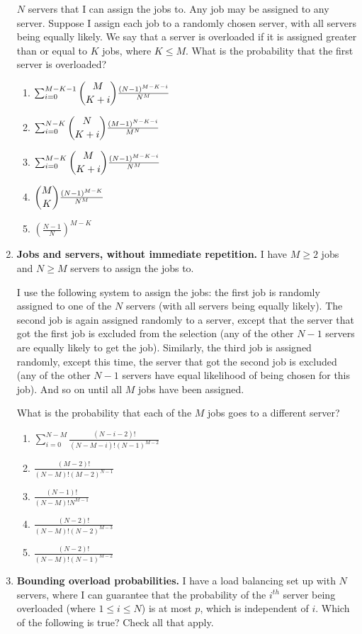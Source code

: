 \documentclass[11pt, preview]{standalone} %
\begin{document}
\begin{enumerate}
    $N$ servers that I can assign the jobs to. Any job may be assigned to any 
    server. Suppose I assign each job to a randomly chosen server, with all 
    servers being equally likely. We say that a server is overloaded if it is 
    assigned greater than or equal to $K$ jobs, where $K \leq M$. What is the 
    probability that the first server is overloaded?
\begin{Multi}
\begin{enumerate}
    \FalseChoice\item $\sum_{i=0}^{M-K-1} \dbinom{M}{K+i} \frac{(N-1)^{M-K-i}}{N^{M}}$
    \FalseChoice\item $\sum_{i=0}^{N-K} \dbinom{N}{K+i} \frac{(M-1)^{N-K-i}}{M^{N}}$
    \TrueChoice\item $\sum_{i=0}^{M-K} \dbinom{M}{K+i} \frac{(N-1)^{M-K-i}}{N^{M}}$
    \FalseChoice\item $\dbinom{M}{K} \frac{(N-1)^{M-K}}{N^{M}}$
    \FalseChoice\item $\left(\frac{N-1}{N}\right)^{M-K}$
\end{enumerate}
\end{Multi}
\item {\bf Jobs and servers, without immediate repetition.} I have $M\geq 2$ 
    jobs and $N \geq M$ servers to assign the jobs to.
    
    I use the following system to assign the jobs: the 
    first job is randomly assigned to one of the $N$ servers (with all servers 
    being equally likely). The second job is again assigned randomly to a 
    server, except that the server that got the first job is excluded from the 
    selection (any of the other $N-1$ servers are equally likely to get the job). 
    Similarly, the third job is assigned randomly, except this time, the 
    server that got the second job is excluded (any of the other $N-1$ servers 
    have equal likelihood of being chosen for this job). And so on until all 
    $M$ jobs have been assigned.

    What is the probability that each of the $M$ jobs goes to a different 
    server?
\begin{Multi}
\begin{enumerate}
    \FalseChoice\item $\sum_{i=0}^{N-M}\frac{(N-i-2)!}{(N-M-i)! (N-1)^{M-2}}$
    \FalseChoice\item $\frac{(M-2)!}{(N-M)! (M-2)^{N-1}}$
    \FalseChoice\item $\frac{(N-1)!}{(N-M)! N^{M-1}}$
    \FalseChoice\item $\frac{(N-2)!}{(N-M)! (N-2)^{M-3}}$
    \TrueChoice\item $\frac{(N-2)!}{(N-M)! (N-1)^{M-2}}$
\end{enumerate}
\end{Multi}
\item {\bf Bounding overload probabilities.} I have a load balancing set up 
    with $N$ servers, where I can guarantee that the probability of the $i^{th}$ 
    server being overloaded (where $1\leq i \leq N$) is at most $p$, which is 
    independent of $i$. Which of the following is true? Check all that apply.
    

\end{enumerate}
\end{document}
